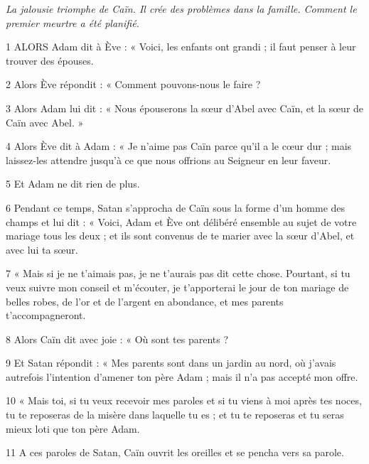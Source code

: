 
\par \textit{La jalousie triomphe de Caïn. Il crée des problèmes dans la famille. Comment le premier meurtre a été planifié.}

\par 1 ALORS Adam dit à Ève : « Voici, les enfants ont grandi ; il faut penser à leur trouver des épouses.

\par 2 Alors Ève répondit : « Comment pouvons-nous le faire ?

\par 3 Alors Adam lui dit : « Nous épouserons la sœur d'Abel avec Caïn, et la sœur de Caïn avec Abel. »

\par 4 Alors Ève dit à Adam : « Je n'aime pas Caïn parce qu'il a le cœur dur ; mais laissez-les attendre jusqu'à ce que nous offrions au Seigneur en leur faveur.

\par 5 Et Adam ne dit rien de plus.

\par 6 Pendant ce temps, Satan s'approcha de Caïn sous la forme d'un homme des champs et lui dit : « Voici, Adam et Ève ont délibéré ensemble au sujet de votre mariage tous les deux ; et ils sont convenus de te marier avec la sœur d'Abel, et avec lui ta sœur.

\par 7 « Mais si je ne t'aimais pas, je ne t'aurais pas dit cette chose. Pourtant, si tu veux suivre mon conseil et m'écouter, je t'apporterai le jour de ton mariage de belles robes, de l'or et de l'argent en abondance, et mes parents t'accompagneront.

\par 8 Alors Caïn dit avec joie : « Où sont tes parents ?

\par 9 Et Satan répondit : « Mes parents sont dans un jardin au nord, où j'avais autrefois l'intention d'amener ton père Adam ; mais il n'a pas accepté mon offre.

\par 10 « Mais toi, si tu veux recevoir mes paroles et si tu viens à moi après tes noces, tu te reposeras de la misère dans laquelle tu es ; et tu te reposeras et tu seras mieux loti que ton père Adam.

\par 11 A ces paroles de Satan, Caïn ouvrit les oreilles et se pencha vers sa parole.

